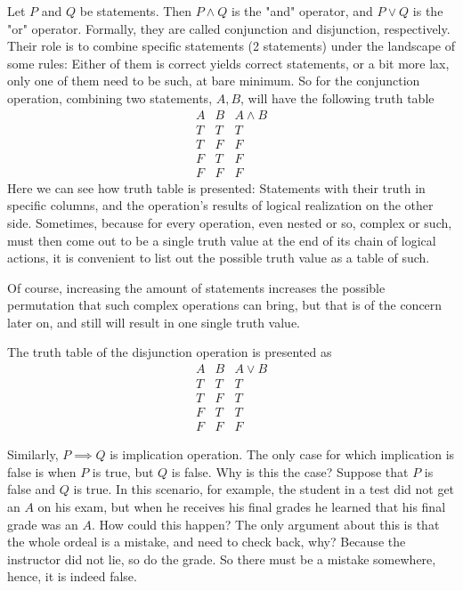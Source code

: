 Let $P$ and $Q$ be statements. Then $P\land Q$ is the "and" operator, and $P\lor Q$ is the "or" operator. Formally, they are called  conjunction and  disjunction, respectively. Their role is to combine specific statements (2 statements) under the landscape of some rules: Either of them is correct yields correct statements, or a bit more lax, only one of them need to be such, at bare minimum. So for the conjunction operation, combining two statements, $A,B$, will have the following truth table 
$$\begin{array}{|c|c|c|}
    A & B & A\land B \\
    T & T  & T \\
    T  & F  & F \\
    F  & T  & F \\
    F  & F & F 
\end{array}$$
Here we can see how truth table is presented: Statements with their truth in specific columns, and the operation's results of logical realization on the other side. Sometimes, because for every operation, even nested or so, complex or such, must then come out to be a single truth value at the end of its chain of logical actions, it is convenient to list out the possible truth value as a table of such. 

Of course, increasing the amount of statements increases the possible permutation that such complex operations can bring, but that is of the concern later on, and still will result in one single truth value. 

The truth table of the disjunction operation is presented as
$$\begin{array}{|c|c|c|}
A & B & A\lor B \\
T  & T & T \\
T & F & T \\
F  & T & T \\
F & F & F
\end{array}$$

Similarly, $P \implies Q$ is implication operation. The only case for which implication is false is when $P$ is true, but $Q$ is false. Why is this the case? Suppose that $P$ is false and $Q$ is true. In this scenario, for example, the student in a test did not get an $A$ on his exam, but when he receives his final grades he learned that his final grade was an $A$. How could this happen? The only argument about this is that the whole ordeal is a mistake, and need to check back, why? Because the instructor did not lie, so do the grade. So there must be a mistake somewhere, hence, it is indeed false. 

